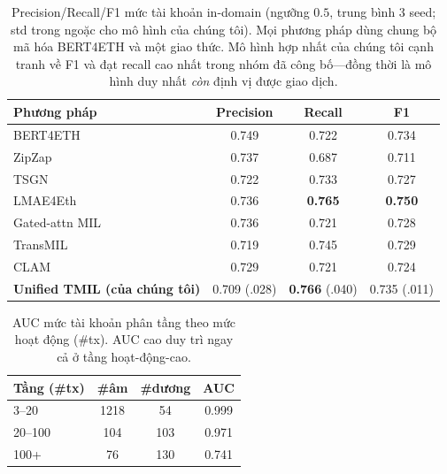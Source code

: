 \documentclass[conference]{IEEEtran}
\newcommand{\best}[1]{\textbf{#1}}
\begin{document}
\begin{table}[t]\centering\caption{Precision/Recall/F1 mức tài khoản in-domain
(ngưỡng $0.5$, trung bình 3 seed; std trong ngoặc cho mô hình của chúng tôi). Mọi
phương pháp dùng chung bộ mã hóa BERT4ETH và một giao thức. Mô hình hợp nhất của
chúng tôi cạnh tranh về F1 và đạt recall cao nhất trong nhóm đã công bố---đồng thời
là mô hình duy nhất \emph{còn} định vị được giao dịch.}\label{tab:prf}
\begin{tabular}{lccc}\toprule
\textbf{Phương pháp} & \textbf{Precision} & \textbf{Recall} & \textbf{F1} \\\midrule
BERT4ETH~\cite{bert4eth} & 0.749 & 0.722 & 0.734 \\
ZipZap~\cite{zipzap} & 0.737 & 0.687 & 0.711 \\
TSGN~\cite{tsgn} & 0.722 & 0.733 & 0.727 \\
LMAE4Eth~\cite{lmae4eth} & 0.736 & \best{0.765} & \best{0.750} \\
Gated-attn MIL~\cite{ilse2018} & 0.736 & 0.721 & 0.728 \\
TransMIL~\cite{transmil} & 0.719 & 0.745 & 0.729 \\
CLAM~\cite{clam} & 0.729 & 0.721 & 0.724 \\\midrule
\textbf{Unified TMIL (của chúng tôi)} & 0.709 \footnotesize{(.028)} & \best{0.766} \footnotesize{(.040)} & 0.735 \footnotesize{(.011)} \\
\bottomrule\end{tabular}\end{table}

\begin{table}[t]\centering\caption{AUC mức tài khoản phân tầng theo mức hoạt động
(\#tx). AUC cao duy trì ngay cả ở tầng hoạt-động-cao.}\label{tab:strat}
\begin{tabular}{lccc}\toprule
\textbf{Tầng (\#tx)} & \textbf{\#âm} & \textbf{\#dương} & \textbf{AUC} \\\midrule
3--20 & 1218 & 54 & 0.999 \\
20--100 & 104 & 103 & 0.971 \\
100+ & 76 & 130 & 0.741 \\\bottomrule
\end{tabular}\end{table}
\end{document}
